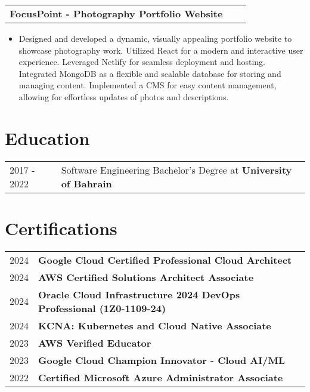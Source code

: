 \documentclass[a4paper,11pt]{article}
\makeatletter
\newenvironment{projectlong}[2]
    {
    \begin{tabularx}{\linewidth}{@{}l X r@{}}
    \textbf{#1} & \hfill &  #2 \\[3.75pt]
    \end{tabularx}
    \begin{minipage}[t]{\linewidth}
    \begin{itemize}[nosep,after=\strut, leftmargin=1em, itemsep=3pt,label=--]
    }
    {
    \end{itemize}
    \end{minipage}    
    }
\makeatother
\begin{document}
\begin{projectlong}{FocusPoint - Photography Portfolio Website}{}
    \item Designed and developed a dynamic, visually appealing portfolio website to showcase photography work.
Utilized React for a modern and interactive user experience.
Leveraged Netlify for seamless deployment and hosting.
Integrated MongoDB as a flexible and scalable database for storing and managing content.
Implemented a CMS for easy content management, allowing for effortless updates of photos and descriptions.
\end{projectlong}




\section{Education}
\begin{tabularx}{\linewidth}{@{}l X@{}}	
2017 - 2022 & Software Engineering Bachelor's Degree at \textbf{University of Bahrain}  \\ 
\end{tabularx}

\section{Certifications}
\begin{tabularx}{\linewidth}{@{}l X@{}}	
2024 & \textbf{Google Cloud Certified Professional Cloud Architect} \\
2024 & \textbf{AWS Certified Solutions Architect Associate}  \\
2024 & \textbf{Oracle Cloud Infrastructure 2024 DevOps Professional (1Z0-1109-24)} \\
2024 & \textbf{KCNA: Kubernetes and Cloud Native Associate}  \\ 
2023 & \textbf{AWS Verified Educator}  \\ 
2023 & \textbf{Google Cloud Champion Innovator - Cloud AI/ML}  \\ 
2022 & \textbf{Certified Microsoft Azure Administrator Associate}  \\ 
\end{tabularx}
\end{document}
